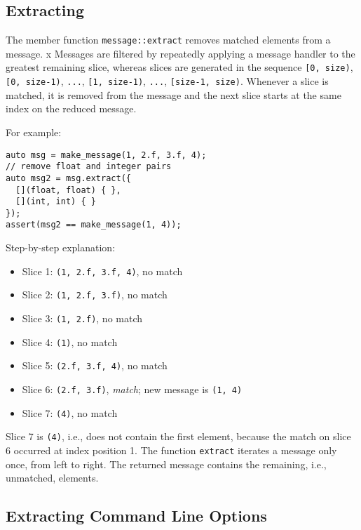 \clearpage
\subsection{Extracting}
\label{extract}

The member function \lstinline^message::extract^ removes matched elements from a message. x
Messages are filtered by repeatedly applying a message handler to the greatest remaining slice, whereas slices are generated in the sequence \lstinline^[0, size)^, \lstinline^[0, size-1)^, \lstinline^...^, \lstinline^[1, size-1)^, \lstinline^...^, \lstinline^[size-1, size)^.
Whenever a slice is matched, it is removed from the message and the next slice starts at the same index on the reduced message.

For example:

\begin{lstlisting}
auto msg = make_message(1, 2.f, 3.f, 4);
// remove float and integer pairs
auto msg2 = msg.extract({
  [](float, float) { },
  [](int, int) { }
});
assert(msg2 == make_message(1, 4));
\end{lstlisting}

Step-by-step explanation:

\begin{itemize}
  \item Slice 1: \lstinline^(1, 2.f, 3.f, 4)^, no match
  \item Slice 2: \lstinline^(1, 2.f, 3.f)^, no match
  \item Slice 3: \lstinline^(1, 2.f)^, no match
  \item Slice 4: \lstinline^(1)^, no match
  \item Slice 5: \lstinline^(2.f, 3.f, 4)^, no match
  \item Slice 6: \lstinline^(2.f, 3.f)^, \emph{match}; new message is \lstinline^(1, 4)^
  \item Slice 7: \lstinline^(4)^, no match
\end{itemize}

Slice 7 is \lstinline^(4)^, i.e., does not contain the first element, because the match on slice 6 occurred at index position 1. The function \lstinline^extract^ iterates a message only once, from left to right.
The returned message contains the remaining, i.e., unmatched, elements.

\clearpage
\subsection{Extracting Command Line Options}
\label{extract-opts}

